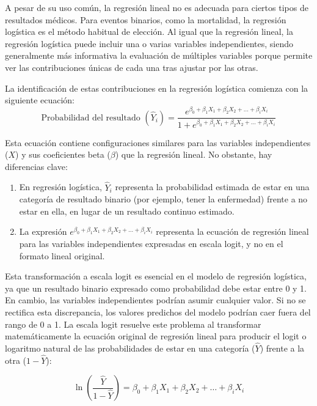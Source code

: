 A pesar de su uso común, la regresión lineal no es adecuada para ciertos tipos de resultados médicos. Para eventos binarios, como la mortalidad, la regresión logística es el método habitual de elección. Al igual que la regresión lineal, la regresión logística puede incluir una o varias variables independientes, siendo generalmente más informativa la evaluación de múltiples variables porque permite ver las contribuciones únicas de cada una tras ajustar por las otras.

La identificación de estas contribuciones en la regresión logística comienza con la siguiente ecuación:
\begin{equation}
\text{Probabilidad del resultado } (\hat{Y}_i) = \frac{e^{\beta_0 + \beta_1 X_1 + \beta_2 X_2 + \ldots + \beta_i X_i}}{1 + e^{\beta_0 + \beta_1 X_1 + \beta_2 X_2 + \ldots + \beta_i X_i}}
\end{equation}

Esta ecuación contiene configuraciones similares para las variables independientes ($X$) y sus coeficientes beta ($\beta$) que la regresión lineal. No obstante, hay diferencias clave:
\begin{enumerate}
    \item En regresión logística, $\hat{Y}_i$ representa la probabilidad estimada de estar en una categoría de resultado binario (por ejemplo, tener la enfermedad) frente a no estar en ella, en lugar de un resultado continuo estimado.
    \item La expresión $e^{\beta_0 + \beta_1 X_1 + \beta_2 X_2 + \ldots + \beta_i X_i}$ representa la ecuación de regresión lineal para las variables independientes expresadas en escala logit, y no en el formato lineal original.
\end{enumerate}

Esta transformación a escala logit es esencial en el modelo de regresión logística, ya que un resultado binario expresado como probabilidad debe estar entre 0 y 1. En cambio, las variables independientes podrían asumir cualquier valor. Si no se rectifica esta discrepancia, los valores predichos del modelo podrían caer fuera del rango de 0 a 1. La escala logit resuelve este problema al transformar matemáticamente la ecuación original de regresión lineal para producir el logit o logaritmo natural de las probabilidades de estar en una categoría (\( \hat{Y} \)) frente a la otra (\( 1 - \hat{Y} \)):

\begin{equation}
\ln\left(\frac{\hat{Y}}{1 - \hat{Y}}\right) = \beta_0 + \beta_1 X_1 + \beta_2 X_2 + \ldots + \beta_i X_i
\end{equation}

